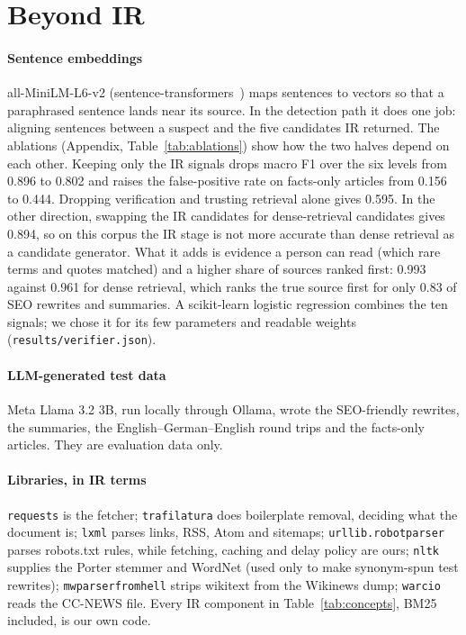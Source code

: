 \documentclass[11pt,a4paper]{article}
\newcommand{\code}[1]{\texttt{#1}}
\begin{document}
\section{Beyond IR}

\paragraph{Sentence embeddings} all-MiniLM-L6-v2 (sentence-transformers~\cite{reimers2019}) maps sentences to vectors so that a paraphrased sentence lands near its source. In the detection path it does one job: aligning sentences between a suspect and the five candidates IR returned. The ablations (Appendix, Table~\ref{tab:ablations}) show how the two halves depend on each other. Keeping only the IR signals drops macro F1 over the six levels from 0.896 to 0.802 and raises the false-positive rate on facts-only articles from 0.156 to 0.444. Dropping verification and trusting retrieval alone gives 0.595. In the other direction, swapping the IR candidates for dense-retrieval candidates gives 0.894, so on this corpus the IR stage is not more accurate than dense retrieval as a candidate generator. What it adds is evidence a person can read (which rare terms and quotes matched) and a higher share of sources ranked first: 0.993 against 0.961 for dense retrieval, which ranks the true source first for only 0.83 of SEO rewrites and summaries. A scikit-learn logistic regression combines the ten signals; we chose it for its few parameters and readable weights (\code{results/verifier.json}).

\paragraph{LLM-generated test data} Meta Llama 3.2 3B, run locally through Ollama, wrote the SEO-friendly rewrites, the summaries, the English--German--English round trips and the facts-only articles. They are evaluation data only.

\paragraph{Libraries, in IR terms} \code{requests} is the fetcher; \code{trafilatura} does boilerplate removal, deciding what the document is; \code{lxml} parses links, RSS, Atom and sitemaps; \code{urllib.robotparser} parses robots.txt rules, while fetching, caching and delay policy are ours; \code{nltk} supplies the Porter stemmer and WordNet (used only to make synonym-spun test rewrites); \code{mwparserfromhell} strips wikitext from the Wikinews dump; \code{warcio} reads the CC-NEWS file. Every IR component in Table~\ref{tab:concepts}, BM25 included, is our own code.
\end{document}
